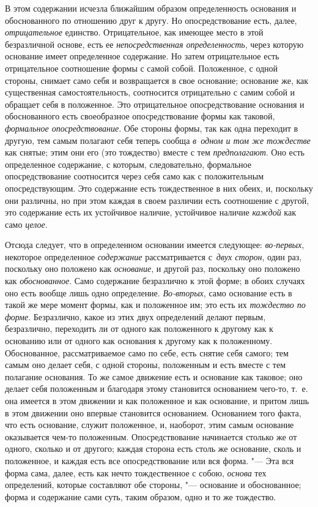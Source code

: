 В этом содержании исчезла ближайшим образом определенность основания и
обоснованного по отношению друг к другу. Но опосредствование есть, далее,
{\em отрицательное} единство. Отрицательное, как имеющее место в этой
безразличной основе, есть ее {\em непосредственная определенность}, через
которую основание имеет определенное содержание. Но затем отрицательное есть
отрицательное соотношение формы с самой собой. Положенное, с одной стороны,
снимает само себя и возвращается в свое основание; основание же, как
существенная самостоятельность, соотносится отрицательно с самим собой и
обращает себя в положенное. Это отрицательное опосредствование основания и
обоснованного есть своеобразное опосредствование формы как таковой,
{\em формальное опосредствование}. Обе стороны формы, так как одна переходит в
другую, тем самым полагают себя теперь сообща {\em в~одном и том же тождестве}
как снятые; этим они его (это тождество) вместе с тем {\em предполагают}. Оно
есть определенное содержание, с которым, следовательно, формальное
опосредствование соотносится через себя само как с положительным
опосредствующим. Это содержание есть тождественное в них обеих, и, поскольку
они различны, но при этом каждая в своем различии есть соотношение с другой,
это содержание есть их устойчивое наличие, устойчивое наличие {\em каждой} как
само {\em целое}.

Отсюда следует, что в определенном основании имеется следующее:
{\em во-первых}, некоторое определенное {\em содержание} рассматривается
с~{\em двух сторон}, один раз, поскольку оно положено как {\em основание}, и
другой раз, поскольку оно положено как {\em обоснованное}. Само содержание
безразлично к этой форме; в обоих случаях оно есть вообще лишь одно
определение. {\em Во-вторых}, само основание есть в такой же мере момент формы,
как и положенное им; это есть их {\em тождество по форме}. Безразлично, какое
из этих двух определений делают первым, безразлично, переходить ли от одного
как положенного к другому как к основанию или от одного как основания к другому
как к положенному. Обоснованное, рассматриваемое само по себе, есть снятие себя
самого; тем самым оно делает себя, с одной стороны, положенным и есть вместе с
тем полагание основания. То же самое движение есть и основание как таковое; оно
делает себя положенным и благодаря этому становится основанием чего-то, т.~е.
она имеется в этом движении и как положенное и как основание, и притом лишь в
этом движении оно впервые становится основанием. Основанием того факта, что
есть основание, служит положенное, и, наоборот, этим самым основание
оказывается чем-то положенным. Опосредствование начинается столько же от
одного, сколько и от другого; каждая сторона есть столь же основание, сколь и
положенное, и каждая есть все опосредствование или вся форма. "--- Эта вся
форма сама, далее, есть как нечто тождественное с собою, {\em основа} тех
определений, которые составляют обе стороны, "--- основание и обоснованное;
форма и содержание сами суть, таким образом, одно и то же тождество.

